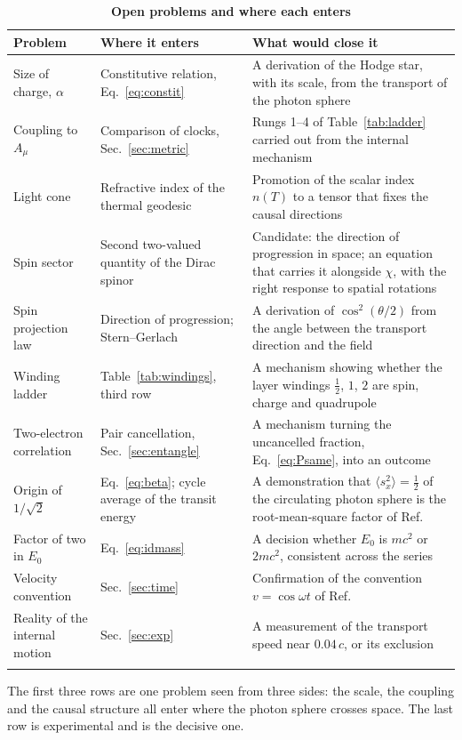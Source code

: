 \documentclass[%
 reprint, amsmath,amssymb, aps, prb, ]{revtex4-2}
\numberwithin{equation}{section}
\begin{document}
\begin{table}[t!]
\centering
\caption{\textbf{Open problems and where each enters}}
\label{tab:open}
\renewcommand{\arraystretch}{1.25}
\begin{tabular}{p{3.6cm}p{4.6cm}p{6.8cm}}
\toprule
\textbf{Problem} & \textbf{Where it enters} & \textbf{What would close it} \\
\midrule
Size of charge, $\alpha$
& Constitutive relation, Eq.~\eqref{eq:constit}
& A derivation of the Hodge star, with its scale, from the transport of the photon sphere \\
\addlinespace[0.15cm]
Coupling to $A_\mu$
& Comparison of clocks, Sec.~\ref{sec:metric}
& Rungs 1--4 of Table~\ref{tab:ladder} carried out from the internal mechanism \\
\addlinespace[0.15cm]
Light cone
& Refractive index of the thermal geodesic
& Promotion of the scalar index $n(T)$ to a tensor that fixes the causal directions \\
\addlinespace[0.15cm]
Spin sector
& Second two-valued quantity of the Dirac spinor
& Candidate: the direction of progression in space; an equation that carries it alongside $\chi$, with the right response to spatial rotations \\
\addlinespace[0.15cm]
Spin projection law
& Direction of progression; Stern--Gerlach
& A derivation of $\cos^2(\theta/2)$ from the angle between the transport direction and the field \\
\addlinespace[0.15cm]
Winding ladder
& Table~\ref{tab:windings}, third row
& A mechanism showing whether the layer windings $\tfrac12$, $1$, $2$ are spin, charge and quadrupole \\
\addlinespace[0.15cm]
Two-electron correlation
& Pair cancellation, Sec.~\ref{sec:entangle}
& A mechanism turning the uncancelled fraction, Eq.~\eqref{eq:Psame}, into an outcome \\
\addlinespace[0.15cm]
Origin of $1/\sqrt2$
& Eq.~\eqref{eq:beta}; cycle average of the transit energy
& A demonstration that $\langle s_x^2\rangle=\tfrac12$ of the circulating photon sphere is the root-mean-square factor of Ref.~\cite{ref:p62} \\
\addlinespace[0.15cm]
Factor of two in $E_0$
& Eq.~\eqref{eq:idmass}
& A decision whether $E_0$ is $mc^2$ or $2mc^2$, consistent across the series \\
\addlinespace[0.15cm]
Velocity convention
& Sec.~\ref{sec:time}
& Confirmation of the convention $v=\cos\omega t$ of Ref.~\cite{ref:p10} \\
\addlinespace[0.15cm]
Reality of the internal motion
& Sec.~\ref{sec:exp}
& A measurement of the transport speed near $0.04\,c$, or its exclusion \\
\addlinespace[0.2cm]
\bottomrule
\end{tabular}
\vspace{0.2cm}
\begin{minipage}{0.95\textwidth}
\justifying\footnotesize
The first three rows are one problem seen from three sides: the scale, the coupling and the causal structure all enter where the photon sphere crosses space. The last row is experimental and is the decisive one.
\end{minipage}
\end{table}
\end{document}
